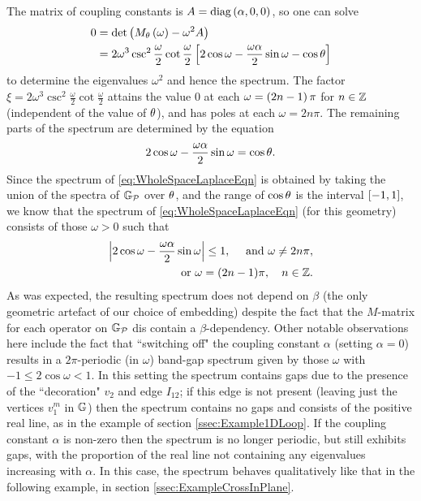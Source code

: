 The matrix of coupling constants is $A=\mathrm{diag}\left( \alpha, 0, 0 \right)$, so one can solve
\begin{align*}
	0 &= \det\left( M_{\theta}\left( \omega \right) - \omega^2 A \right) \\
	&= 2\omega^3\csc^2\frac{\omega}{2}\cot\frac{\omega}{2}\left[  2\cos\omega - \frac{\omega\alpha}{2}\sin\omega - \cos\theta \right]
\end{align*}
to determine the eigenvalues $\omega^2$ and hence the spectrum.
The factor $\xi = 2\omega^3\csc^2\frac{\omega}{2}\cot\frac{\omega}{2}$ attains the value 0 at each $\omega=\left( 2n-1 \right)\pi$ for $n\in\mathbb{Z}$ (independent of the value of $\theta$), and has poles at each $\omega=2n\pi$.
The remaining parts of the spectrum are determined by the equation
\begin{align*}
	2\cos\omega - \frac{\omega\alpha}{2}\sin\omega = \cos\theta.
\end{align*}
Since the spectrum of \eqref{eq:WholeSpaceLaplaceEqn} is obtained by taking the union of the spectra of $\mathbb{G}_{\mathcal{P}}$ over $\theta$, and the range of $\cos\theta$ is the interval $\left[ -1,1 \right]$, we know that the spectrum of \eqref{eq:WholeSpaceLaplaceEqn} (for this geometry) consists of those $\omega>0$ such that
\begin{align*}
	\left\lvert  2\cos\omega - \frac{\omega\alpha}{2}\sin\omega \right\rvert \leq 1, 
	\quad\text{ and }\omega\neq 2n\pi, \\
	\text{or} \ \omega= (2n-1)\pi, \quad n\in\mathbb{Z}.
\end{align*}
As was expected, the resulting spectrum does not depend on $\beta$ (the only geometric artefact of our choice of embedding) despite the fact that the $M$-matrix for each operator on $\mathbb{G}_{\mathcal{P}}$ dis contain a $\beta$-dependency.
Other notable observations here include the fact that ``switching off" the coupling constant $\alpha$ (setting $\alpha=0$) results in a $2\pi$-periodic (in $\omega$) band-gap spectrum given by those $\omega$ with $-1\leq 2\cos\omega < 1$.
In this setting the spectrum contains gaps due to the presence of the ``decoration" $v_2$ and edge $I_{12}$; if this edge is not present (leaving just the vertices $v_1^m$ in $\mathbb{G}$) then the spectrum contains no gaps and consists of the positive real line, as in the example of section \ref{ssec:Example1DLoop}.
If the coupling constant $\alpha$ is non-zero then the spectrum is no longer periodic, but still exhibits gaps, with the proportion of the real line not containing any eigenvalues increasing with $\alpha$.
In this case, the spectrum behaves qualitatively like that in the following example, in section \ref{ssec:ExampleCrossInPlane}.

